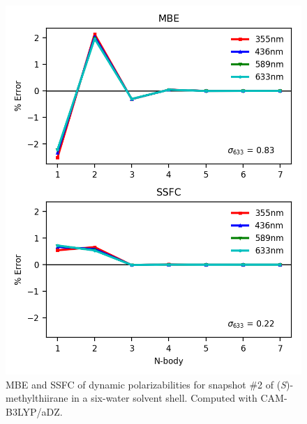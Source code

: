         \begin{figure}
            \centering\includegraphics[scale=0.75]{p1/graphs/metthi2_6_pol.png}
            \caption{MBE and SSFC of dynamic polarizabilities for
              snapshot \#2 of (\textit{S})-methylthiirane in a six-water solvent shell. Computed with CAM-B3LYP/aDZ.}
                \label{metthi2_pol}
        \end{figure}

\clearpage
